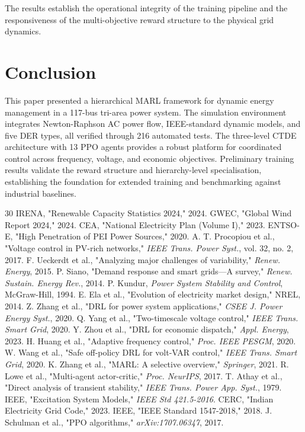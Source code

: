 \documentclass[conference]{IEEEtran}
\begin{document}
The results establish the operational integrity of the training pipeline and the responsiveness of the multi-objective reward structure to the physical grid dynamics.

\section{Conclusion}

This paper presented a hierarchical MARL framework for dynamic energy management in a 117-bus tri-area power system. The simulation environment integrates Newton-Raphson AC power flow, IEEE-standard dynamic models, and five DER types, all verified through 216 automated tests. The three-level CTDE architecture with 13 PPO agents provides a robust platform for coordinated control across frequency, voltage, and economic objectives. Preliminary training results validate the reward structure and hierarchy-level specialisation, establishing the foundation for extended training and benchmarking against industrial baselines.

\begin{thebibliography}{30}
 IRENA, "Renewable Capacity Statistics 2024," 2024.
 GWEC, "Global Wind Report 2024," 2024.
 CEA, "National Electricity Plan (Volume I)," 2023.
 ENTSO-E, "High Penetration of PEI Power Sources," 2020.
 A. T. Procopiou et al., "Voltage control in PV-rich networks," \textit{IEEE Trans. Power Syst.}, vol. 32, no. 2, 2017.
 F. Ueckerdt et al., "Analyzing major challenges of variability," \textit{Renew. Energy}, 2015.
 P. Siano, "Demand response and smart grids---A survey," \textit{Renew. Sustain. Energy Rev.}, 2014.
 P. Kundur, \textit{Power System Stability and Control}, McGraw-Hill, 1994.
 E. Ela et al., "Evolution of electricity market design," NREL, 2014.
 Z. Zhang et al., "DRL for power system applications," \textit{CSEE J. Power Energy Syst.}, 2020.
 Q. Yang et al., "Two-timescale voltage control," \textit{IEEE Trans. Smart Grid}, 2020.
 Y. Zhou et al., "DRL for economic dispatch," \textit{Appl. Energy}, 2023.
 H. Huang et al., "Adaptive frequency control," \textit{Proc. IEEE PESGM}, 2020.
 W. Wang et al., "Safe off-policy DRL for volt-VAR control," \textit{IEEE Trans. Smart Grid}, 2020.
 K. Zhang et al., "MARL: A selective overview," \textit{Springer}, 2021.
 R. Lowe et al., "Multi-agent actor-critic," \textit{Proc. NeurIPS}, 2017.
 T. Athay et al., "Direct analysis of transient stability," \textit{IEEE Trans. Power App. Syst.}, 1979.
 IEEE, "Excitation System Models," \textit{IEEE Std 421.5-2016}.
 CERC, "Indian Electricity Grid Code," 2023.
 IEEE, "IEEE Standard 1547-2018," 2018.
 J. Schulman et al., "PPO algorithms," \textit{arXiv:1707.06347}, 2017.
\end{thebibliography}
\end{document}
